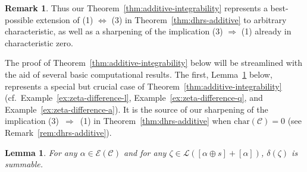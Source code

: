 \documentclass[preprint,12pt]{elsarticle}
\numberwithin{equation}{section} %
\theoremstyle{theorem}
\newtheorem{lemma}[theorem]{Lemma}
\theoremstyle{definition}
\newtheorem{remark}[theorem]{Remark}
\newcommand{\Ca}{\mathcal{C}} %
\newcommand{\ec}{\mathcal{E}} %
\begin{document}
\begin{remark}
Thus our Theorem~\ref{thm:additive-integrability} represents a best-possible extension of (1) $\Leftrightarrow$ (3) in Theorem~\ref{thm:dhrs-additive} to arbitrary characteristic, as well as a sharpening of the implication (3) $\Rightarrow$ (1) already in characteristic zero.
\end{remark}




The proof of Theorem~\ref{thm:additive-integrability} below will be streamlined with the aid of several basic computational results. The first, Lemma~\ref{lem:delta-zeta-summable} below, represents a special but crucial case of Theorem~\ref{thm:additive-integrability} (cf.~Example~\ref{ex:zeta-difference-l}, Example~\ref{ex:zeta-difference-q}, and Example~\ref{ex:zeta-difference-a}). It is the source of our sharpening of the implication (3)~$\Rightarrow$~(1) in Theorem~\ref{thm:dhrs-additive} when $\mathrm{char}(\Ca)=0$ (see Remark~\ref{rem:dhrs-additive}).

\begin{lemma} \label{lem:delta-zeta-summable}
    For any $\alpha\in\ec(\Ca)$ and for any $\zeta\in\mathcal{L}([\alpha\oplus s]+[\alpha])$, $\delta(\zeta)$ is summable.
\end{lemma}
\end{document}
